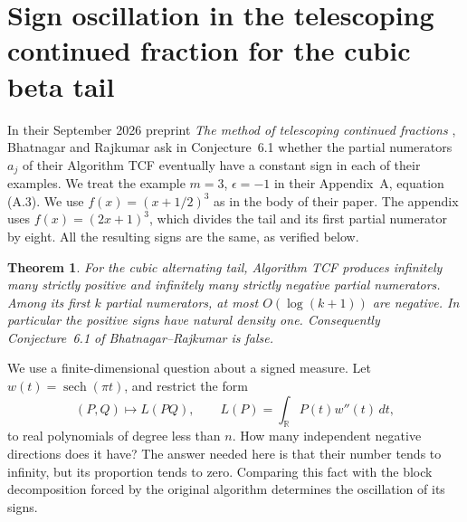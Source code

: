 \documentclass[11pt,a4paper]{article}
\newtheorem{theorem}{Theorem}[section]
\theoremstyle{definition}
\theoremstyle{remark}
\numberwithin{equation}{section}
\begin{document}
\section{Sign oscillation in the telescoping continued fraction for the cubic beta tail}
\label{sec:br-sign}

In their September 2026 preprint \emph{The method of telescoping continued
fractions} \cite{BhatnagarRajkumar2026}, Bhatnagar and Rajkumar ask in
Conjecture~6.1 whether the partial numerators $a_j$ of their Algorithm TCF
eventually have a constant sign in each of their examples. We treat the
example $m=3$, $\epsilon=-1$ in their Appendix~A, equation (A.3).
We use $f(x)=(x+1/2)^3$ as in the body of their paper. The appendix uses
$f(x)=(2x+1)^3$, which divides the tail and its first partial numerator
by eight. All the resulting signs are the same, as verified below.

\begin{theorem}\label{brsign:main}
For the cubic alternating tail, Algorithm TCF produces infinitely many
strictly positive and infinitely many strictly negative partial numerators.
Among its first $k$ partial numerators, at most $O(\log(k+1))$ are
negative. In particular the positive signs have natural density one.
Consequently Conjecture~6.1 of Bhatnagar--Rajkumar is false.
\end{theorem}

We use a finite-dimensional question about a signed measure. Let $w(t)=
\operatorname{sech}(\pi t)$, and restrict the form
\[
  (P,Q)\longmapsto L(PQ),\qquad L(P)=\int_{\mathbb R}P(t)w''(t)\,dt,
\]
to real polynomials of degree less than $n$. How many independent negative
directions does it have? The answer needed here is that their number tends
to infinity, but its proportion tends to zero. Comparing this fact with
the block decomposition forced by the original algorithm determines the
oscillation of its signs.
\end{document}
